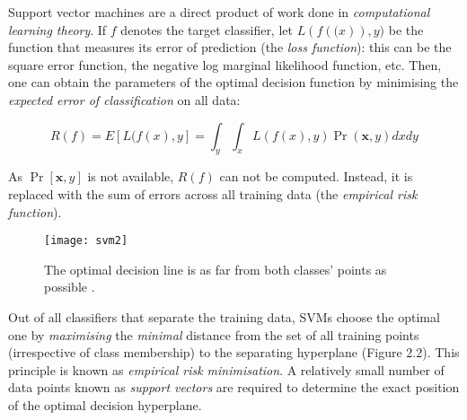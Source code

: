 \documentclass[12pt,twoside,notitlepage,amsart]{report} %
\begin{document}
%	
	
	Support vector machines are a direct product of work done in \emph{computational learning theory}. If $f$ denotes the target classifier, let $L(f(\mathbf(x)), y)$ be the function that measures its error of prediction (the \emph{loss function}): this can be the square error function, the negative log marginal likelihood function, etc. Then, one can obtain the parameters of the {optimal decision function} by minimising the \emph{expected error of classification} on all data: 

	\begin{equation}
	  \displaystyle R(f) = E[L(f(x), y] = \int_{y} \int_{x} L(f(x), y) \Pr(\mathbf{x},y) dx dy  
	\end{equation} 

	
As $\Pr[\mathbf{x}, y]$ is not available, $R(f)$ can not be computed. Instead, it is replaced with the {sum} of errors across all {training data} (the \emph{empirical risk function}). 

	\begin{figure} 
	\texttt{[image: svm2]}
	
	\caption{\small{The optimal decision line is as far from both classes' points as possible \cite{Bishop06}.}}%
	\label{}%
	\end{figure}

Out of all classifiers that {separate} the training data, SVMs choose the {optimal} one by \emph{maximising} the \emph{minimal} distance from the set of all training points (irrespective of class membership) to the separating hyperplane (Figure 2.2). This principle is known as \emph{empirical risk minimisation}. A relatively small number of data points known as \emph{support vectors} are required to determine the exact position of the optimal decision hyperplane. 
	
\end{document}

